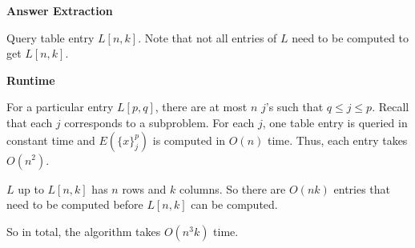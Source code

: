 \documentclass[10pt]{article}
\begin{document}
\begin{solution}
\begin{enumerate}[(a)]
{            \textbf{Answer Extraction}

            Query table entry $L[n, k]$. 
            Note that not all entries of $L$ need to be computed to get 
            $L[n, k]$. 

            \textbf{Runtime}

            For a particular entry $L[p, q]$, there are at most $n$ $j$'s such 
            that $q \leq j \leq p$. 
            Recall that each $j$ corresponds to a subproblem. 
            For each $j$, one table entry is queried in constant time and 
            $E(\{x\}_j^p)$ is computed in $O(n)$ time. 
            Thus, each entry takes $O(n^2)$. 

            $L$ up to $L[n, k]$ has $n$ rows and $k$ columns. 
            So there are $O(nk)$ entries that need to be computed before $L[n, k]$ 
            can be computed. 

            So in total, the algorithm takes $O(n^3k)$ time. 
            
        }

    \end{enumerate}

\end{solution}

\newpage


\end{document}
